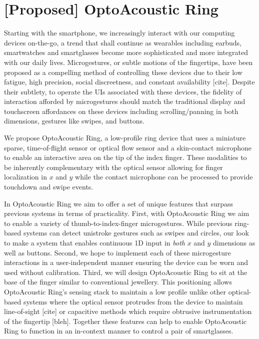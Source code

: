 \documentclass [11pt, proquest] {uwthesis}[2020/02/24]
\begin{document}
\chapter{[Proposed] OptoAcoustic Ring}

Starting with the smartphone, we increasingly interact with our computing devices on-the-go, a trend that shall continue as wearables including earbuds, smartwatches and smartglasses become more sophisticated and more integrated with our daily lives. Microgestures, or subtle motions of the fingertips, have been proposed as a compelling method of controlling these devices due to their low fatigue, high precision, social discreetness, and constant availability [cite].
Despite their subtlety, to operate the UIs associated with these devices, the fidelity of interaction afforded by microgestures should match the traditional display and touchscreen affordances on these devices including scrolling/panning in both dimensions, gestures like swipes, and buttons.

We propose OptoAcoustic Ring, a low-profile ring device that uses a miniature sparse, time-of-flight sensor or optical flow sensor and a skin-contact microphone to enable an interactive area on the tip of the index finger. These modalities to be inherently complementary with the optical sensor allowing for finger localization in $x$ and $y$ while the contact microphone can be processed to provide touchdown and swipe events.  

In OptoAcoustic Ring we aim to offer a set of unique features that surpass previous systems in terms of practicality. 
First, with OptoAcoustic Ring we aim to enable a variety of  thumb-to-index-finger microgestures. While previous ring-based systems can detect unistroke gestures such as swipes and circles, our look to make a system that  enables continuous 1D input in \textit{both} $x$ and $y$ dimensions as well as buttons.
Second, we hope to implement each of these microgesture interactions in a user-independent manner ensuring the device can be worn and used without calibration.
Third, we will design OptoAcoustic Ring to sit at the base of the finger similar to conventional jewellery. This positioning allows OptoAcoustic Ring's sensing stack to maintain a low profile unlike other optical-based systems where the optical sensor protrudes from the device to maintain line-of-sight  [cite] or capacitive methods which require obtrusive instrumentation of the fingertip [bleh].
Together these features can help to enable OptoAcoustic Ring to function in an in-context manner to control a pair of smartglasses.
\end{document}
